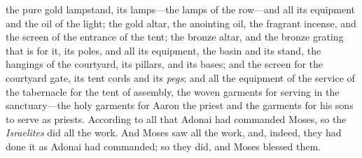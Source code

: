 \begin{biblechapter}
\verse the pure gold lampstand, its lamps—the lamps of the row—and all its equipment and the oil of the light;
\verse the gold altar, the anointing oil, the fragrant incense, and the screen of the entrance of the tent;
\verse the bronze altar, and the bronze grating that is for it, its poles, and all its equipment, the basin and its stand,
\verse the hangings of the courtyard, its pillars, and its bases; and the screen for the courtyard gate, its tent cords and its \textit{pegs}; and all the equipment of the service of the tabernacle for the tent of assembly,
\verse the woven garments for serving in the sanctuary—the holy garments for Aaron the priest and the garments for his sons to serve as priests.
\verse According to all that Adonai had commanded Moses, so the \textit{Israelites} did all the work.
\verse And Moses saw all the work, and, indeed, they had done it as Adonai had commanded; so they did, and Moses blessed them.
\end{biblechapter}


